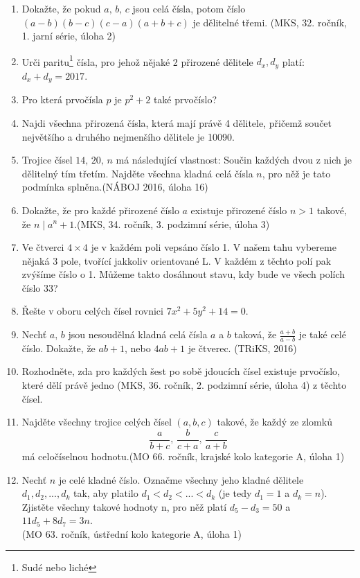 \documentclass[12pt,a4paper]{report}
\begin{document}
\begin{enumerate}
	\item Dokažte, že pokud $a,\, b,\, c$ jsou celá čísla, potom číslo $(a - b)(b - c)(c -a)(a + b + c)$ je dělitelné
	třemi. \hfill(MKS, 32. ročník, 1. jarní série, úloha 2)
	\item Urči paritu\footnote{Sudé nebo liché} čísla, pro jehož nějaké 2 přirozené dělitele $d_x,d_y$ platí: $d_x+d_y=2017$. 
	\item Pro která prvočísla $p$ je $p^2 + 2$ také prvočíslo?
	\item Najdi všechna přirozená čísla, která mají právě 4 dělitele, přičemž součet největšího a druhého nejmenšího dělitele je 10090.
	\item Trojice čísel $14,\,20,\,n$ má následující vlastnost: Součin každých dvou z nich je dělitelný tím třetím. Najděte všechna kladná celá čísla $n$, pro něž je tato podmínka splněna.\hfill(NÁBOJ 2016, úloha 16) 
	\item Dokažte, že pro každé přirozené číslo $a$ existuje přirozené číslo $n > 1$ takové, že $n \mid a^n + 1$.\hfill(MKS, 34. ročník, 3. podzimní série, úloha 3)
	\item Ve čtverci $4\times4$ je v každém poli vepsáno číslo 1. V našem tahu vybereme nějaká 3 pole, tvořící jakkoliv orientované L. V každém z těchto polí pak zvýšíme číslo o 1. Můžeme takto dosáhnout stavu, kdy bude ve všech polích číslo 33?
	\item Řešte v oboru celých čísel rovnici $7x^2+5y^2+14=0$.
	\item Nechť $a,\,b$ jsou nesoudělná kladná celá čísla $a$ a $b$ taková, že $\frac{a+b}{a-b}$ je také celé
	číslo. Dokažte, že $ab + 1$, nebo $4ab + 1$ je čtverec. \hfill(TRiKS, 2016)
	\item Rozhodněte, zda pro každých šest po sobě jdoucích čísel existuje prvočíslo, které dělí právě jedno \hfill(MKS, 36. ročník, 2. podzimní série, úloha 4)
	z těchto čísel.	
	\item Najděte všechny trojice celých čísel $(a, b, c)$ takové, že každý ze zlomků
	$$\frac{a}{b+c},\,\frac{b}{c+a},\,\frac{c}{a+b}$$ má celočíselnou hodnotu.\hfill(MO 66. ročník, krajské kolo kategorie A, úloha 1)
	\item Nechť $n$ je celé kladné číslo. Označme všechny jeho kladné dělitele $d_1, d_2, . . . , d_k$
	tak, aby platilo $d_1 < d_2 < . . . < d_k$ (je tedy $d_1 = 1$ a $d_k = n$). Zjistěte všechny
	takové hodnoty n, pro něž platí $d_5 -d_3 = 50$ a $11d_5 + 8d_7 = 3n$. \\ \hfill(MO 63. ročník, ústřední kolo kategorie A, úloha 1)
\end{enumerate}	
\end{document}
